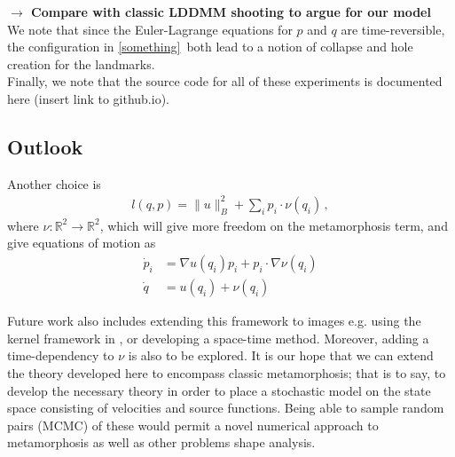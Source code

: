 \documentclass{article}
\begin{document}








\textbf{$\longrightarrow$ Compare with classic LDDMM shooting to argue for our
model}\\

We note that since the Euler-Lagrange equations for $p$ and $q$ are
time-reversible, the configuration in \ref{something} both lead to a notion of
collapse and hole creation for the landmarks.\\

Finally, we note that the source code for all of these experiments is documented
here (insert link to github.io). 

\subsection{Outlook}\label{sec:outlook}
Another choice is 
\begin{align}
    l(q,p) = \|u\|_B^2 + \sum_i p_i\cdot \nu(q_i) \, , 
\end{align}
where $\nu:\mathbb R^2 \to \mathbb R^2$, which will give more freedom on the metamorphosis term, and give equations of motion as 
\begin{align}
    \dot p_i  &= \nabla u(q_i)p_i  + p_i \cdot \nabla \nu(q_i)\\
    \dot q &= u(q_i) + \nu(q_i) 
\end{align}

Future work also includes extending this framework to images e.g. using the
kernel framework in \cite{richardson2016metamorphosis}, or developing a
space-time method. Moreover, adding a time-dependency to $\nu$ is also to be
explored. It is our hope that we can extend the theory developed here to
encompass classic metamorphosis; that is to say, to develop the necessary theory
in order to place a stochastic model on the state space consisting of
velocities and source functions. Being able to sample random pairs (MCMC) of these
would permit a novel numerical approach to metamorphosis as well as other
problems shape analysis.



\end{document}
